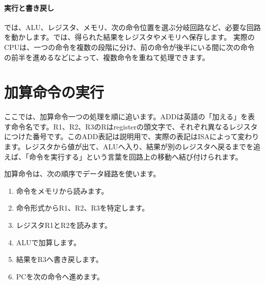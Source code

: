 \par
\endgroup
\medskip
\begingroup
\paragraph{実行と書き戻し}
        では、ALU、レジスタ、メモリ、次の命令位置を選ぶ分岐回路など、必要な回路を動かします。では、得られた結果をレジスタやメモリへ保存します。
        実際のCPUは、一つの命令を複数の段階に分け、前の命令が後半にいる間に次の命令の前半を進めるなどによって、複数命令を重ねて処理できます。

\par
\endgroup
\par
\endgroup


\section{加算命令の実行}
\label{sec:01-digital-computer-17}

ここでは、加算命令一つの処理を順に追います。ADDは英語の「加える」を表す命令名です。R1、R2、R3のRはregisterの頭文字で、それぞれ異なるレジスタにつけた番号です。このADD表記は説明用で、実際の表記はISAによって変わります。レジスタから値が出て、ALUへ入り、結果が別のレジスタへ戻るまでを追えば、「命令を実行する」という言葉を回路上の移動へ結び付けられます。

\begingroup
{}\par\medskip
\begingroup
      \centering
\par
\endgroup
\medskip
\begingroup
      加算命令は、次の順序でデータ経路を使います。
      \begin{enumerate}
        \item 命令をメモリから読みます。
        \item 命令形式からR1、R2、R3を特定します。
        \item レジスタR1とR2を読みます。
        \item ALUで加算します。
        \item 結果をR3へ書き戻します。
        \item PCを次の命令へ進めます。
      \end{enumerate}
\par
\endgroup
\par
\endgroup



